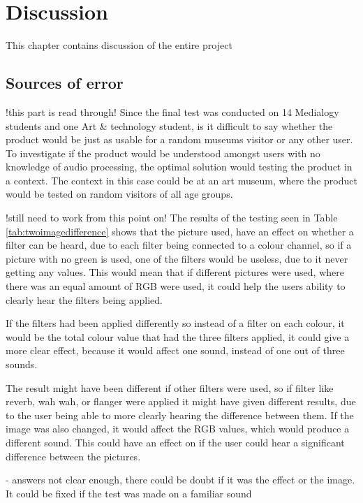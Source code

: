 \chapter{Discussion}\label{ch:discussion}
This chapter contains discussion of the entire project 

\section{Sources of error}
!this part is read through!
Since the final test was conducted on 14 Medialogy students and one Art \& technology student, is it difficult to say whether the product would be just as usable for a random museums visitor or any other user. To investigate if the product would be understood amongst users with no knowledge of audio processing, the optimal solution would testing the product in a context. The context in this case could be at an art museum, where the product would be tested on random visitors of all age groups.

!still need to work from this point on!
The results of the testing seen in Table \ref{tab:twoimagedifference} shows that the picture used, have an effect on whether a filter can be heard, due to each filter being connected to a colour channel, so if a picture with no green is used, one of the filters would be useless, due to it never getting any values. This would mean that if different pictures were used, where there was an equal amount of RGB were used, it could help the users ability to clearly hear the filters being applied. 
   
If the filters had been applied differently so instead of a filter on each colour, it would be the total colour value that had the three filters applied, it could give a more clear effect, because it would affect one sound, instead of one out of three sounds. 
 
The result might have been different if other filters were used, so if filter like reverb, wah wah, or flanger were applied it might have given different results, due to the user being able to more clearly hearing the difference between them. If the image was also changed, it would affect the RGB values, which would produce a different sound. This could have an effect on if the user could hear a significant difference between the pictures.

- answers not clear enough, there could be doubt if it was the effect or the image. It could be fixed if the test was made on a familiar sound

